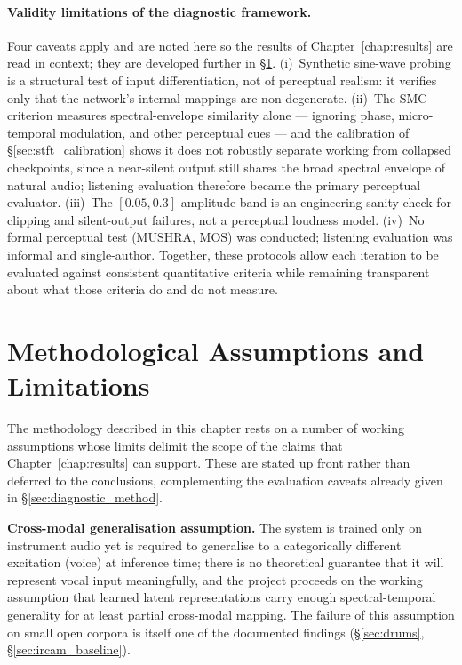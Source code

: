 \documentclass[a4paper,11pt,oneside,openany]{book}
\begin{document}
\paragraph{Validity limitations of the diagnostic framework.} Four caveats apply and are noted here so the results of Chapter~\ref{chap:results} are read in context; they are developed further in \S\ref{sec:method_limitations}. (i)~Synthetic sine-wave probing is a structural test of input differentiation, not of perceptual realism: it verifies only that the network's internal mappings are non-degenerate. (ii)~The SMC criterion measures spectral-envelope similarity alone --- ignoring phase, micro-temporal modulation, and other perceptual cues --- and the calibration of \S\ref{sec:stft_calibration} shows it does not robustly separate working from collapsed checkpoints, since a near-silent output still shares the broad spectral envelope of natural audio; listening evaluation therefore became the primary perceptual evaluator. (iii)~The $[0.05, 0.3]$ amplitude band is an engineering sanity check for clipping and silent-output failures, not a perceptual loudness model. (iv)~No formal perceptual test (MUSHRA, MOS) was conducted; listening evaluation was informal and single-author. Together, these protocols allow each iteration to be evaluated against consistent quantitative criteria while remaining transparent about what those criteria do and do not measure.

\section{Methodological Assumptions and Limitations}\label{sec:method_limitations}

The methodology described in this chapter rests on a number of working assumptions whose limits delimit the scope of the claims that Chapter~\ref{chap:results} can support. These are stated up front rather than deferred to the conclusions, complementing the evaluation caveats already given in \S\ref{sec:diagnostic_method}.

\textbf{Cross-modal generalisation assumption.} The system is trained only on instrument audio yet is required to generalise to a categorically different excitation (voice) at inference time; there is no theoretical guarantee that it will represent vocal input meaningfully, and the project proceeds on the working assumption that learned latent representations carry enough spectral-temporal generality for at least partial cross-modal mapping. The failure of this assumption on small open corpora is itself one of the documented findings (\S\ref{sec:drums}, \S\ref{sec:ircam_baseline}).
\end{document}
